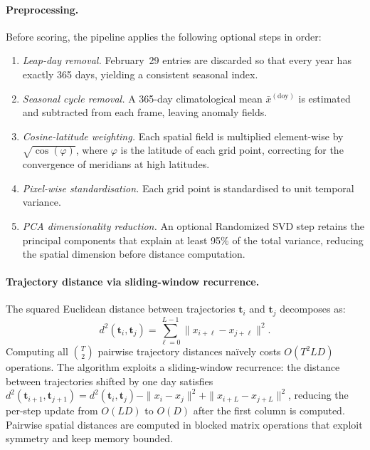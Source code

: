 \documentclass[runningheads]{llncs}
\begin{document}
\paragraph{Preprocessing.}
Before scoring, the pipeline applies the following optional steps in order:
\begin{enumerate}
  \item \emph{Leap-day removal.} February~29 entries are discarded so that
        every year has exactly 365 days, yielding a consistent seasonal index.
  \item \emph{Seasonal cycle removal.} A 365-day climatological mean
        $\bar{x}^{(\text{doy})}$ is estimated and subtracted from each frame,
        leaving anomaly fields.
  \item \emph{Cosine-latitude weighting.} Each spatial field is multiplied
        element-wise by $\sqrt{\cos(\varphi)}$, where $\varphi$ is the
        latitude of each grid point, correcting for the convergence of
        meridians at high latitudes.
  \item \emph{Pixel-wise standardisation.} Each grid point is standardised
        to unit temporal variance.
  \item \emph{PCA dimensionality reduction.} An optional Randomized SVD
        step retains the principal components that explain at least 95\%
        of the total variance, reducing the spatial dimension before distance
        computation.
\end{enumerate}

\paragraph{Trajectory distance via sliding-window recurrence.}
The squared Euclidean distance between trajectories $\mathbf{t}_i$ and
$\mathbf{t}_j$ decomposes as:
\begin{equation}
  d^2(\mathbf{t}_i, \mathbf{t}_j)
  = \sum_{\ell=0}^{L-1} \|x_{i+\ell} - x_{j+\ell}\|^2.
  \label{eq:traj-dist}
\end{equation}
Computing all $\binom{T}{2}$ pairwise trajectory distances naïvely costs
$O(T^2 L D)$ operations.
The algorithm exploits a sliding-window recurrence: the distance between
trajectories shifted by one day satisfies
$d^2(\mathbf{t}_{i+1}, \mathbf{t}_{j+1}) = d^2(\mathbf{t}_i, \mathbf{t}_j)
- \|x_i - x_j\|^2 + \|x_{i+L} - x_{j+L}\|^2$,
reducing the per-step update from $O(LD)$ to $O(D)$ after the first column
is computed.
Pairwise spatial distances are computed in blocked matrix operations that
exploit symmetry and keep memory bounded.
\end{document}
